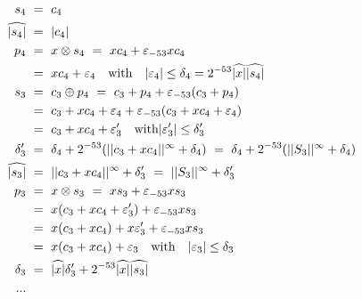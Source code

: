 \begin{align*}
  s_4 & \ = \ c_4\\
  \widehat{|s_{4}|} & \ = \  |c_4|\\
  p_4 & \ = \  x \otimes s_4 \ = \  x c_4 + \varepsilon_{-53} x c_4 \\
      & \ = \  xc_4 + \varepsilon_4 \quad \mathrm{with} \quad |\varepsilon_4| \le \delta_4 = 2^{-53}{\widehat{|x|}} \widehat{|s_{4}|}\\
  s_3 & \ = \  c_3 \oplus p_4 \ = \  c_3 + p_4 + \varepsilon_{-53}(c_3 + p_4) \\
      & \ = \  c_3 +  xc_4 + \varepsilon_4 + \varepsilon_{-53}(c_3 + xc_4 + \varepsilon_4) \\
      & \ = \  c_3 +  xc_4 + \varepsilon'_3  
      \quad \mathrm{with} |\varepsilon'_3| \le \delta'_3\\
  \delta'_3 & \ =\  \delta_4 + 2^{-53}(||{c_3 + xc_4}||^{\infty} + \delta_4)\  =\  \delta_4 + 2^{-53}(||{S_3}||^{\infty} + \delta_4)\\
  \widehat{|s_{3}|} & \ = \  ||{c_3 + xc_4}||^{\infty} + \delta'_3 \ = \  ||{S_3}||^{\infty} + \delta'_3\\ 
  p_3 & \ = \  x \otimes s_3 \ = \  x s_3 + \varepsilon_{-53} x s_3 \\
      & \ = \  x(c_3 +  xc_4 + \varepsilon'_3) + \varepsilon_{-53} x s_3\\
      & \ = \  x(c_3 +  xc_4) + x\varepsilon'_3 + \varepsilon_{-53} x s_3\\
      & \ = \  x(c_3 +  xc_4) +  \varepsilon_3 \quad \mathrm{with} \quad 
      |\varepsilon_3| \le \delta_3\\
  \delta_3 & \ =\ {\widehat{|x|}}\delta'_3 + 2^{-53} {\widehat{|x|}} \widehat{|s_{3}|}\\
...
\end{align*}


